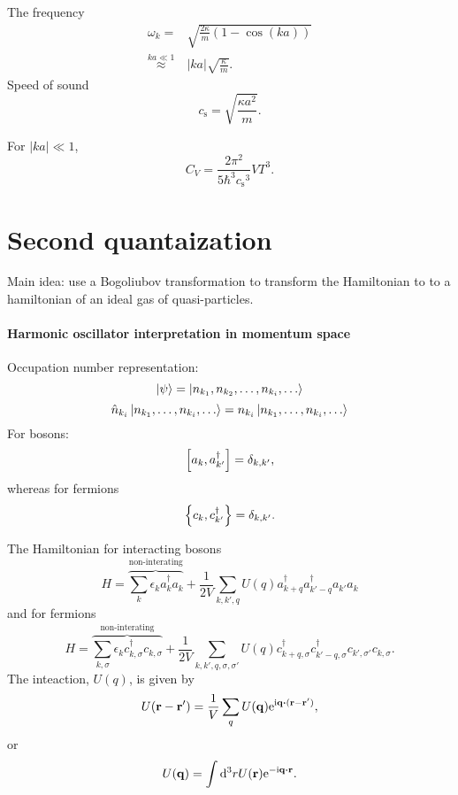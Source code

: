 \documentclass[11pt,letter, swedish, english, twocolumn
]{article}
\newcommand{\cs}{\ensuremath{{c_{\text{s}}}}}
\begin{document}
The frequency
\begin{equation}
\begin{aligned}
\omega_k=&\sqrt{\frac{2\kappa}{m}(1-\cos(ka))}\\
\stackrel{ka\ll1}{\approx}&|ka|\sqrt{\frac{\kappa}{m}}.
\end{aligned}
\end{equation}
Speed of sound
\begin{equation}
\cs=\sqrt{\frac{\kappa a^2}{m}}.
\end{equation}

For $|ka|\ll1$, 
\begin{equation}
C_V=\frac{2\pi^2}{5\hbar^3\cs^3} VT^3.
\end{equation}






\section{Second quantaization}
Main idea: use a Bogoliubov transformation to transform the
Hamiltonian to to a hamiltonian of an ideal gas of quasi-particles. 

\paragraph{Harmonic oscillator interpretation in momentum space}
Occupation number representation:
\begin{equation}
\ket{\psi}=\ket{n_{k_1}, n_{k_2},\ldots, n_{k_i},\ldots}
\end{equation}
\begin{equation}
\hat{n}_{k_i}\ket{n_{k_1}, \ldots, n_{k_i},\ldots}=
{n}_{k_i}\ket{n_{k_1}, \ldots, n_{k_i},\ldots}
\end{equation}
For bosons:
\begin{equation}
\comm{a_k}{ a^\dagger_{k'}}=\delta_{k, k'},
\end{equation}
whereas for fermions
\begin{equation}
\acomm{c_k}{ c^\dagger_{k'}}=\delta_{k, k'}.
\end{equation}

The Hamiltonian for interacting bosons
\begin{equation}
H=\overbrace{\sum_k \epsilon_k a_k^\dagger a_k}^{\text{non-interating}}
+\frac{1}{2V}\sum_{k, k', q} U(q) a_{k+q}^\dagger a_{k'-q}^\dagger 
a_{k'}a_{k}
\end{equation}
and for fermions
\begin{equation}
H=\overbrace{\sum_{k, \sigma} \epsilon_k c_{k,\sigma}^\dagger c_{k,\sigma}}^{\text{non-interating}}
+\frac{1}{2V}\sum_{k, k', q, \sigma, \sigma'} 
U(q) c_{k+q,\sigma}^\dagger c_{k'-q,\sigma}^\dagger c_{k',\sigma'}c_{k,\sigma}.
\end{equation}
The inteaction, $U(q)$, is given by
\begin{equation}
U(\vb{r}-\vb{r'})=\frac{1}{V}\sum_q U(\vb{q})\ee^{\ii\vb{q}\vdot(\vb{r}-\vb{r}')},
\end{equation}
or
\begin{equation}
U(\vb{q})=\int\rd^3rU(\vb{r})\ee^{-\ii\vb{q}\vdot\vb{r}}.
\end{equation}
\end{document}
